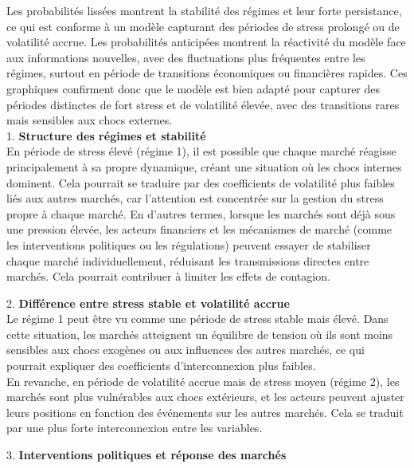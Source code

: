 Les probabilités lissées montrent la stabilité des régimes et leur forte persistance, ce qui est conforme à un modèle capturant des périodes de stress prolongé ou de volatilité accrue. Les probabilités anticipées montrent la réactivité du modèle face aux informations nouvelles, avec des fluctuations plus fréquentes entre les régimes, surtout en période de transitions économiques ou financières rapides. Ces graphiques confirment donc que le modèle est bien adapté pour capturer des périodes distinctes de fort stress et de volatilité élevée, avec des transitions rares mais sensibles aux chocs externes.\\

1. \textbf{Structure des régimes et stabilité} \\

En période de stress élevé (régime 1), il est possible que chaque marché réagisse principalement à sa propre dynamique, créant une situation où les chocs internes dominent. Cela pourrait se traduire par des coefficients de volatilité plus faibles liés aux autres marchés, car l’attention est concentrée sur la gestion du stress propre à chaque marché. En d’autres termes, lorsque les marchés sont déjà sous une pression élevée, les acteurs financiers et les mécanismes de marché (comme les interventions politiques ou les régulations) peuvent essayer de stabiliser chaque marché individuellement, réduisant les transmissions directes entre marchés. Cela pourrait contribuer à limiter les effets de contagion.

\vspace{0.5cm}

2. \textbf{Différence entre stress stable et volatilité accrue} \\

Le régime 1 peut être vu comme une période de stress stable mais élevé. Dans cette situation, les marchés atteignent un équilibre de tension où ils sont moins sensibles aux chocs exogènes ou aux influences des autres marchés, ce qui pourrait expliquer des coefficients d’interconnexion plus faibles. \\
En revanche, en période de volatilité accrue mais de stress moyen (régime 2), les marchés sont plus vulnérables aux chocs extérieurs, et les acteurs peuvent ajuster leurs positions en fonction des événements sur les autres marchés. Cela se traduit par une plus forte interconnexion entre les variables.

\vspace{0.5cm}

3. \textbf{Interventions politiques et réponse des marchés} \\

